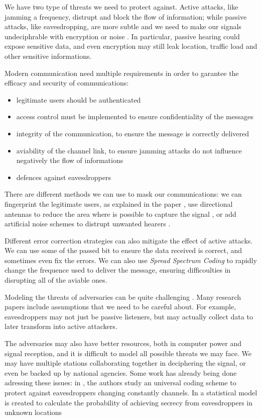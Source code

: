 We have two type of threats we need to protect against. Active attacks, like jamming a frequency, distrupt and block the flow of information; while passive attacks, like eavesdropping, are more subtle and we need to make our signals undeciphrable with encryption or noise \cite{5751298}. In particular, passive hearing could expose sensitive data, and even encryption may still leak location, traffic load and other sensitive informations.

Modern communication need multiple requirements in order to garantee the efficacy and security of communications:
\begin{itemize}
  \item legitimate users should be authenticated
  \item access control must be implemented to ensure confidentiality of the messages
  \item integrity of the communication, to ensure the message is correctly delivered
  \item aviability of the channel link, to ensure jamming attacks do not influence negatively the flow of informations
  \item defences against eavesdroppers
\end{itemize}

There are different methods we can use to mask our communications: we can fingerprint the legitimate users, as explained in the paper \cite{228fe14543ce4cefba3bb9cc11741362}, use directional antennas to reduce the area where is possible to capture the signal \cite{4543070}, or add artificial noise schemes to distrupt unwanted hearers \cite{1605889}.

Different error correction strategies can also mitigate the effect of active attacks. We can use some of the passed bit to ensure the data received is correct, and sometimes even fix the errors. We can also use \textit{Spread Spectrum Coding} to rapidly change the frequence used to deliver the message, ensuring difficoulties in disrupting all of the aviable ones.


Modeling the threats of adversaries can be quite challenging \cite{7120011}. Many research papers include assumptions that we need to be careful about. For example, eavesdroppers may not just be passive listeners, but may actually collect data to later transform into active attackers.

The adversaries may also have better resources, both in computer power and signal reception, and it is difficult to model all possible threats we may face. We may have multiple stations collaborating together in deciphering the signal, or even be backed up by national agencies. Some work has already being done adressing these issues: in \cite{5707054}, the authors study an universal coding scheme to protect against eavesdroppers changing constantly channels. In \cite{7543509} a statistical model is created to calculate the probability of achieving secrecy from eavesdroppers in unknown locations


